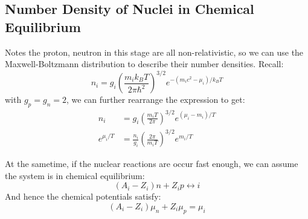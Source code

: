 \subsection{Number Density of Nuclei in Chemical Equilibrium}
\begin{foundation}
    Notes the proton, neutron in this stage are all non-relativistic, so we can use the Maxwell-Boltzmann distribution to describe their number densities. Recall:
    \[
        n_i = g_i \left( \frac{m_i k_B T}{2\pi \hbar^2} \right)^{3/2} e^{-(m_i c^2 - \mu_i)/k_B T}
    \]
    with $g_p = g_n = 2$, we can further rearrange the expression to get:
    \begin{align*}
        n_i &= g_i \left( \frac{m_i T}{2 \pi} \right)^{3/2} e^{(\mu_i - m_i) / T} \\
        e^{\mu_i/ T} &= \frac{n_i}{g_i} \left( \frac{2\pi}{m_i T} \right)^{3/2} e^{m_i / T}
    \end{align*}

    At the sametime, if the nuclear reactions are occur fast enough, we can assume the system is in chemical equilibrium:
    \[
        (A_i - Z_i) n + Z_i p \leftrightarrow i
    \]
    And hence the chemical potentials satisfy:
    \[
        (A_i - Z_i) \mu_n + Z_i \mu_p = \mu_i
    \] \\


\end{foundation}
